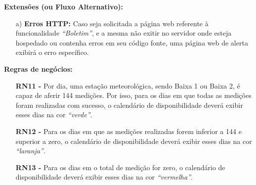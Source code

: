 \begin{mdframed}
\begin{flushleft}
		\textbf{Extensões (ou Fluxo Alternativo):}
		\begin{itemize}
			\item[a)] \textbf{Erros HTTP:} Caso seja solicitada a página web referente à funcionalidade \textit{``Boletim''}, e a mesma não exitir no servidor onde esteja hospedado ou contenha erros em seu código fonte, uma página web de alerta exibirá o erro específico.
		\end{itemize}

		\textbf{Regras de negócios:}
		\begin{itemize}
			\item[] \textbf{RN11 - } Por dia, uma estação meteorológica, sendo Baixa 1 ou Baixa 2, é capaz de aferir 144 medições. Por isso, para os dias em que todas as medições foram realizadas com sucesso, o calendário de disponibilidade deverá exibir esses dias na cor \emph{``verde''}.

			\item[] \textbf{RN12 - } Para os dias em que as medições realizadas forem inferior a 144 e superior a zero, o calendário de disponibilidade deverá exibir esses dias na cor \emph{``laranja''}.

			\item[] \textbf{RN13 - } Para os dias em o total de medição for zero, o calendário de disponibilidade deverá exibir esses dias na cor \emph{``vermelha''}.
		\end{itemize}

		\end{flushleft}

	\end{mdframed}


